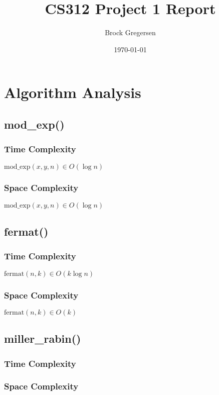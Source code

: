 \documentclass[12pt]{article}
\title{CS312 Project 1 Report}
\author{Brock Gregersen}
\date{\today}
\begin{document}
\maketitle

\tableofcontents
\newpage


\section{Algorithm Analysis}

\subsection{mod\_exp()}

\subsubsection{Time Complexity}
$ \text{mod\_exp}(x,y,n) \in O(\log{n}) $

\subsubsection{Space Complexity}
$ \text{mod\_exp}(x,y,n) \in O(\log{n}) $

\subsection{fermat()}

\subsubsection{Time Complexity}
$ \text{fermat}(n,k) \in O(k\log{n})$

\subsubsection{Space Complexity}
$ \text{fermat}(n,k) \in O(k)$

\subsection{miller\_rabin()}

\subsubsection{Time Complexity}

\subsubsection{Space Complexity}
\end{document}
